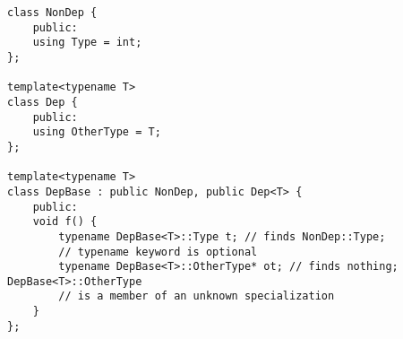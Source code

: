 \begin{lstlisting}[style=styleCXX]
class NonDep {
	public:
	using Type = int;
};

template<typename T>
class Dep {
	public:
	using OtherType = T;
};

template<typename T>
class DepBase : public NonDep, public Dep<T> {
	public:
	void f() {
		typename DepBase<T>::Type t; // finds NonDep::Type;
		// typename keyword is optional
		typename DepBase<T>::OtherType* ot; // finds nothing; DepBase<T>::OtherType
		// is a member of an unknown specialization
	}
};
\end{lstlisting}























